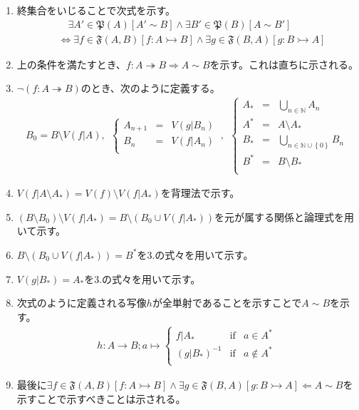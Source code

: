 \documentclass[dvipdfmx]{jsarticle}
\begin{document}
\begin{enumerate}
\item
  終集合をいじることで次式を示す。
\begin{align*}
&\quad \exists A'\in \mathfrak{P}(A)\left[ A' \sim B \right] \land \exists B'\in \mathfrak{P}(B)\left[ A \sim B' \right] \\
&\Leftrightarrow \exists f\in \mathfrak{F}(A,B)[ f:A \rightarrowtail B] \land \exists g\in \mathfrak{F}(B,A)[ g:B \rightarrowtail A]
\end{align*}
\item
  上の条件を満たすとき、$f:A \twoheadrightarrow B \Rightarrow A \sim B$を示す。これは直ちに示される。
\item
  $\neg(f:A \twoheadrightarrow B)$のとき、次のように定義する。
\begin{align*}
B_{0} = B \setminus V\left( f|A \right),\ \ \left\{ \begin{matrix}
A_{n + 1} & = & V\left( g|B_{n} \right) \\
B_{n} & = & V\left( f|A_{n} \right) \\
\end{matrix} \right.\ ,\ \ \left\{ \begin{matrix}
A_{*} & = & \bigcup_{n \in \mathbb{N}} A_{n} \\
A^{*} & = & A \setminus A_{*} \\
B_{*} & = & \bigcup_{n \in \mathbb{N} \cup \left\{ 0 \right\}} B_{n} \\
B^{*} & = & B \setminus B_{*} \\
\end{matrix} \right.\ 
\end{align*}
\item
  $V\left( f|A \setminus A_{*} \right) = V(f) \setminus V\left( f|A_{*} \right)$を背理法で示す。
\item
  $\left( B \setminus B_{0} \right) \setminus V\left( f|A_{*} \right) = B \setminus \left( B_{0} \cup V\left( f|A_{*} \right) \right)$を元が属する関係と論理式を用いて示す。
\item
  $B \setminus \left( B_{0} \cup V\left( f|A_{*} \right) \right) = B^{*}$を3.の式々を用いて示す。
\item
  $V\left( g|B_{*} \right) = A_{*}$を3.の式々を用いて示す。
\item
  次式のように定義される写像$h$が全単射であることを示すことで$A \sim B$を示す。
\begin{align*}
h:A \rightarrow B;a \mapsto \left\{ \begin{matrix}
f|A_{*} & {\mathrm {if}} & a \in A^{*} \\
\left( g|B_{*} \right)^{- 1} & {\mathrm {if}} & a \notin A^{*} \\
\end{matrix} \right.\ 
\end{align*}
\item
  最後に$\exists f\in \mathfrak{F}(A,B)[ f:A \rightarrowtail B] \land \exists g \in \mathfrak{F}(B,A)[ g:B \rightarrowtail A] \Leftarrow A \sim B$を示すことで示すべきことは示される。
\end{enumerate}
\end{document}
